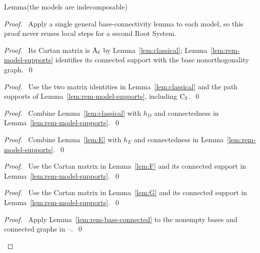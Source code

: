 \begin{namedresult}{Lemma}{(the models are indecomposable)}\label{lem:models-irreducible}
\end{namedresult}
\begin{proof}
\pfsketch\ Apply a single general base-connectivity lemma to each model,
so this proof never reuses local steps for a second Root System.
\begin{proof}\pf\ Its Cartan matrix is $\mathrm{A}_\ell$ by
Lemma~\ref{lem:classical}; Lemma~\ref{lem:rem-model-supports}
identifies its connected support with the base nonorthogonality graph.~\qed\end{proof}
\begin{proof}\pf\ Use the two matrix identities in
Lemma~\ref{lem:classical} and the path supports of
Lemma~\ref{lem:rem-model-supports}, including $\mathrm{C}_2$.~\qed\end{proof}
\begin{proof}\pf\ Combine Lemma~\ref{lem:classical} with $h_D$ and
connectedness in Lemma~\ref{lem:rem-model-supports}.~\qed\end{proof}
\begin{proof}\pf\ Combine Lemma~\ref{lem:E} with $h_E$ and
connectedness in Lemma~\ref{lem:rem-model-supports}.~\qed\end{proof}
\begin{proof}\pf\ Use the Cartan matrix in Lemma~\ref{lem:F}
and its connected support in Lemma~\ref{lem:rem-model-supports}.~\qed\end{proof}
\begin{proof}\pf\ Use the Cartan matrix in Lemma~\ref{lem:G}
and its connected support in Lemma~\ref{lem:rem-model-supports}.~\qed\end{proof}
\qedstep
\begin{proof}\pf\ Apply Lemma~\ref{lem:rem-base-connected}
to the nonempty bases and connected graphs in
--.~\qed\end{proof}
\end{proof}

